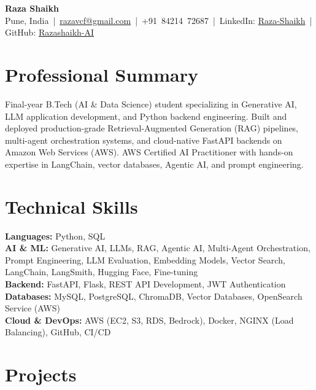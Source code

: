 \documentclass[11pt,a4paper]{article}
\begin{document}
\vspace{-20pt}
\begin{center}
    {\LARGE \textbf{Raza Shaikh}} \\
    \vspace{2pt}
    {\footnotesize Pune, India \,|\, \href{mailto:razavcf@gmail.com}{razavcf@gmail.com} \,|\, +91~84214~72687 \,|\, LinkedIn: \href{https://www.linkedin.com/in/raza-shaikh-ai/}{Raza-Shaikh} \,|\, GitHub: \href{https://github.com/raza-shaikh-ai}{Razashaikh-AI}}
\end{center}




\vspace{-18pt}
\section*{Professional Summary}
Final-year B.Tech (AI \& Data Science) student specializing in Generative AI, LLM application development, and Python backend engineering. Built and deployed production-grade Retrieval-Augmented Generation (RAG) pipelines, multi-agent orchestration systems, and cloud-native FastAPI backends on Amazon Web Services (AWS). AWS Certified AI Practitioner with hands-on expertise in LangChain, vector databases, Agentic AI, and prompt engineering.

\vspace{-10pt}
\section*{Technical Skills}
\vspace{-2pt}

\textbf{Languages:} Python, SQL \\
\textbf{AI \& ML:} Generative AI, LLMs, RAG, Agentic AI, Multi-Agent Orchestration, Prompt Engineering,
LLM Evaluation, Embedding Models, Vector Search, LangChain, LangSmith, Hugging Face, Fine-tuning \\
\textbf{Backend:} FastAPI, Flask, REST API Development, JWT Authentication \\
\textbf{Databases:} MySQL, PostgreSQL, ChromaDB, Vector Databases, OpenSearch Service (AWS) \\
\textbf{Cloud \& DevOps:} AWS (EC2, S3, RDS, Bedrock), Docker, NGINX (Load Balancing), GitHub, CI/CD

\vspace{-12pt}
\section*{Projects}
\vspace{-3pt}
\end{document}
